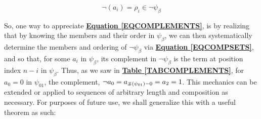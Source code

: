 \documentclass[a4paper, 18pt]{book} %
\newcommand{\invpi}{\rotatebox[origin=c]{180}{$\pi$}}
\begin{document}
\begin{equation}
\label{EQCOMPLEMENTS}
\lnot(a_i) = \rho_i \in \lnot\psi_\beta
\end{equation}


So, one way to appreciate \textbf{\hyperref[EQCOMPLEMENTS]{Equation \ref{EQCOMPLEMENTS}}}, is by realizing that by knowing the members and their order in $\psi_\beta$, we can then systematically determine the members and ordering of $\lnot\psi_\beta$ via \textbf{\hyperref[EQCOMPSETS]{Equation \ref{EQCOMPSETS}}}, and so that, for some $a_i$ in $\psi_\beta$, its complement in $\lnot\psi_\beta$ is the term at position index $n-i$ in $\psi_\beta$. Thus, as we saw in \textbf{\hyperref[TABCOMPLEMENTS]{Table \ref{TABCOMPLEMENTS}}}, for $a_0 = 0$ in $\psi_{01}$, the complement, $\lnot a_0 = a_{\invpi(\psi_{01})-0} = a_2 = 1$. This mechanics can be extended or applied to sequences of arbitrary length and composition as necessary. For purposes of future use, we shall generalize this with a useful theorem as such:


\end{document}
